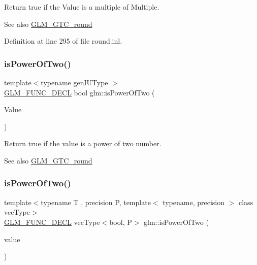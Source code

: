 Return true if the \textquotesingle{}Value\textquotesingle{} is a multiple of \textquotesingle{}Multiple\textquotesingle{}.

\begin{DoxySeeAlso}{See also}
\mbox{\hyperlink{group__gtc__round}{G\+L\+M\+\_\+\+G\+T\+C\+\_\+round}} 
\end{DoxySeeAlso}


Definition at line 295 of file round.\+inl.

\mbox{\label{group__gtc__round_gaebf826fbb6e0a70eeaab0792d89b25ec}} 
\subsubsection{\texorpdfstring{isPowerOfTwo()}{isPowerOfTwo()}\hspace{0.1cm}{\footnotesize\ttfamily [1/2]}}
{\footnotesize\ttfamily template$<$typename gen\+I\+U\+Type $>$ \\
\mbox{\hyperlink{setup_8hpp_ab2d052de21a70539923e9bcbf6e83a51}{G\+L\+M\+\_\+\+F\+U\+N\+C\+\_\+\+D\+E\+CL}} bool glm\+::is\+Power\+Of\+Two (\begin{DoxyParamCaption}\item[{gen\+I\+U\+Type}]{Value }\end{DoxyParamCaption})}

Return true if the value is a power of two number.

\begin{DoxySeeAlso}{See also}
\mbox{\hyperlink{group__gtc__round}{G\+L\+M\+\_\+\+G\+T\+C\+\_\+round}} 
\end{DoxySeeAlso}
\mbox{\label{group__gtc__round_gad454e4c8d8cd73ddc7de855f733a1465}} 
\subsubsection{\texorpdfstring{isPowerOfTwo()}{isPowerOfTwo()}\hspace{0.1cm}{\footnotesize\ttfamily [2/2]}}
{\footnotesize\ttfamily template$<$typename T , precision P, template$<$ typename, precision $>$ class vec\+Type$>$ \\
\mbox{\hyperlink{setup_8hpp_ab2d052de21a70539923e9bcbf6e83a51}{G\+L\+M\+\_\+\+F\+U\+N\+C\+\_\+\+D\+E\+CL}} vec\+Type$<$bool, P$>$ glm\+::is\+Power\+Of\+Two (\begin{DoxyParamCaption}\item[{vec\+Type$<$ T, P $>$ const \&}]{value }\end{DoxyParamCaption})}

